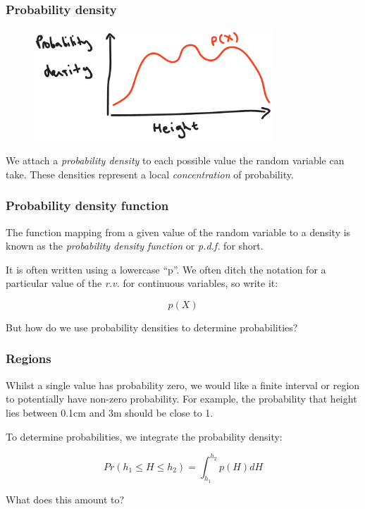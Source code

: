 \documentclass{beamer}
\begin{document}
	\begin{frame}
		\frametitle{Probability density}
		
		\begin{figure}[ht]
			\centerline{\includegraphics[width=0.8\textwidth]{./figures/height_density.pdf}}
		\end{figure}
		
		We attach a \textit{probability density} to each possible value the random variable can take. These densities represent a local \textit{concentration} of probability.
		
	\end{frame}
	
	\begin{frame}
		\frametitle{Probability density function}
		
		The function mapping from a given value of the random variable to a density is known as the \textit{probability density function} or \textit{p.d.f.} for short.
		
		\vspace{0.5cm}
		
		It is often written using a lowercase ``p''. We often ditch the notation for a particular value of the \textit{r.v.} for continuous variables, so write it:
		
		\begin{equation}
		p(X)
		\end{equation}
		
		But how do we use probability densities to determine probabilities?
		
	\end{frame}
	
	\begin{frame}
		\frametitle{Regions}
		
		Whilst a single value has probability zero, we would like a finite interval or region to potentially have non-zero probability. For example, the probability that height lies between 0.1cm and 3m should be close to 1.
		
		\vspace{0.5cm}
		
		To determine probabilities, we integrate the probability density:
		
		\begin{equation}
		Pr(h_1 \leq H \leq h_2) = \int_{h_1}^{h_2} p(H) dH
		\end{equation}
		
		What does this amount to?
		
	\end{frame}
	
\end{document}
